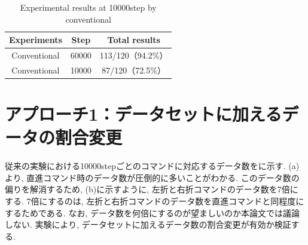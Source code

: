 \vspace{0.5cm}

\begin{table}[hbtp]
  \caption{Experimental results at 10000step by conventional}
  \label{table:result_without}
  \centering
  \begin{tabular}{|c|c|c|}
    \hline
    Experiments & Step & Total results\\
    \hline
    Conventional & 60000 & 113/120（94.2\%）\\
    \hline
    Conventional & 10000 & 87/120（72.5\%）\\
    \hline
  \end{tabular}
\end{table}

\newpage



\section{アプローチ1：データセットに加えるデータの割合変更}
従来の実験における10000stepごとのコマンドに対応するデータ数をに示す.  (a)より, 直進コマンド時のデータ数が圧倒的に多いことがわかる. このデータ数の偏りを解消するため,  (b)に示すように, 左折と右折コマンドのデータ数を7倍にする. 7倍にするのは, 左折と右折コマンドのデータ数を直進コマンドと同程度にするためである. なお, データ数を何倍にするのが望ましいのか本論文では議論しない. 実験により, データセットに加えるデータ数の割合変更が有効か検証する.




